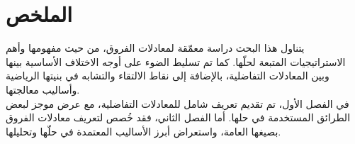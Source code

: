 \chapter*{الملخص}

يتناول هذا البحث دراسة معمّقة لمعادلات الفروق، من حيث مفهومها وأهم الاستراتيجيات المتبعة لحلّها. كما تم تسليط الضوء على أوجه الاختلاف الأساسية بينها وبين المعادلات التفاضلية، بالإضافة إلى نقاط الالتقاء والتشابه في بنيتها الرياضية وأساليب معالجتها.\\
\noindent
في الفصل الأول، تم تقديم تعريف شامل للمعادلات التفاضلية، مع عرض موجز لبعض الطرائق المستخدمة في حلها. أما الفصل الثاني، فقد خُصص لتعريف معادلات الفروق بصيغها العامة، واستعراض أبرز الأساليب المعتمدة في حلّها وتحليلها.